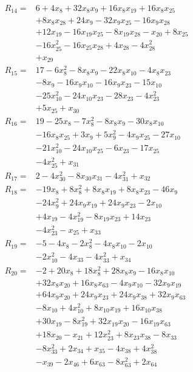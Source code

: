 \begin{align*}
R_{14}={}&6 +4x_{8} +32x_{8}x_{9} +16x_{8}x_{19} +16x_{8}x_{25}\\
&+8x_{8}x_{28} +24x_{9} -32x_{9}x_{25} -16x_{9}x_{28}\\
&+12x_{19} -16x_{19}x_{25} -8x_{19}x_{28} -x_{20} +8x_{25}\\
&-16x_{25}^{2} -16x_{25}x_{28} +4x_{28} -4x_{28}^{2}\\
&+x_{29}\\[3pt]
R_{15}={}&17 -6x_{8}^{2} -8x_{8}x_{9} -22x_{8}x_{10} -4x_{8}x_{23}\\
&-8x_{9} -16x_{9}x_{10} -16x_{9}x_{23} -15x_{10}\\
&-25x_{10}^{2} -24x_{10}x_{23} -28x_{23} -4x_{23}^{2}\\
&+5x_{25} +x_{30}\\[3pt]
R_{16}={}&19 -25x_{8} -7x_{8}^{2} -8x_{8}x_{9} -30x_{8}x_{10}\\
&-16x_{8}x_{25} +3x_{9} +5x_{9}^{2} -4x_{9}x_{25} -27x_{10}\\
&-21x_{10}^{2} -24x_{10}x_{25} -6x_{23} -17x_{25}\\
&-4x_{25}^{2} +x_{31}\\[3pt]
R_{17}={}&2 -4x_{30}^{2} -8x_{30}x_{31} -4x_{31}^{2} +x_{32}\\[3pt]
R_{18}={}&-19x_{8} +8x_{8}^{2} +8x_{8}x_{19} +8x_{8}x_{23} -46x_{9}\\
&-24x_{9}^{2} +24x_{9}x_{19} +24x_{9}x_{23} -2x_{10}\\
&+4x_{19} -4x_{19}^{2} -8x_{19}x_{23} +14x_{23}\\
&-4x_{23}^{2} -x_{25} +x_{33}\\[3pt]
R_{19}={}&-5 -4x_{8} -2x_{8}^{2} -4x_{8}x_{10} -2x_{10}\\
&-2x_{10}^{2} -4x_{33} -4x_{33}^{2} +x_{34}\\[3pt]
R_{20}={}&-2 +20x_{8} +18x_{8}^{2} +28x_{8}x_{9} -16x_{8}x_{10}\\
&+32x_{8}x_{20} +16x_{8}x_{63} -4x_{9}x_{10} -32x_{9}x_{19}\\
&+64x_{9}x_{20} +24x_{9}x_{23} +24x_{9}x_{38} +32x_{9}x_{63}\\
&-8x_{10} +4x_{10}^{2} +8x_{10}x_{19} +16x_{10}x_{38}\\
&+30x_{19} -8x_{19}^{2} +32x_{19}x_{20} -16x_{19}x_{63}\\
&+18x_{20} -x_{21} +12x_{23}^{2} +8x_{23}x_{38} -8x_{33}\\
&-8x_{33}^{2} +2x_{34} +x_{35} -4x_{38} +4x_{38}^{2}\\
&-x_{39} -2x_{46} +6x_{63} -8x_{63}^{2} +2x_{64}\\[3pt]

\end{align*}
